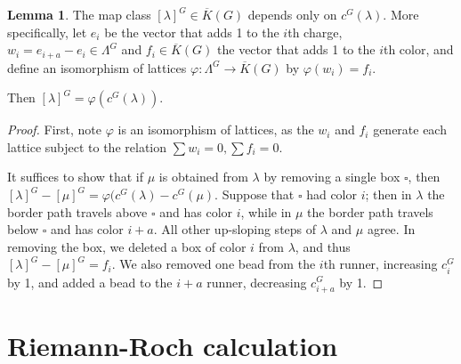 \documentclass{amsart}[12pt]
\theoremstyle{definition}
\newtheorem{lemma}[dummy]{Lemma}
\begin{document}
\begin{center}
\end{center}



\begin{lemma}
  The map class $[\lambda]^G\in\overline{K}(G)$ depends only on $c^G(\lambda)$.  
More specifically, let $e_i$ be the vector that adds 1 to the $i$th charge, $w_i=e_{i+a}-e_i\in\Lambda^G$ and $f_i\in\overline{K}(G)$ the vector that adds 1 to the $i$th color, and define an isomorphism of lattices $\varphi:\Lambda^G\to\overline{K}(G)$ by $\varphi(w_i)=f_i$.

Then $[\lambda]^G=\varphi(c^G(\lambda))$.
\end{lemma}

\begin{proof}
First, note $\varphi$ is an isomorphism of lattices, as the $w_i$ and $f_i$ generate each lattice subject to the relation $\sum w_i=0, \sum f_i=0$.

It suffices to show that if $\mu$ is obtained from $\lambda$ by removing a single box $\square$, then $[\lambda]^G-[\mu]^G=\varphi(c^G(\lambda)-c^G(\mu)$.  Suppose that $\square$ had color $i$; then in $\lambda$ the border path travels above $\square$ and has color $i$, while in $\mu$ the border path travels below $\square$ and has color $i+a$.  All other up-sloping steps of $\lambda$ and $\mu$ agree.  In removing the box, we deleted a box of color $i$ from $\lambda$, and thus $[\lambda]^G-[\mu]^G=f_i$.  We also removed one bead from the $i$th runner, increasing $c^G_i$ by 1, and added a bead to the $i+a$ runner, decreasing $c^G_{i+a}$ by 1.




\end{proof}



\section{Riemann-Roch calculation}
\end{document}
